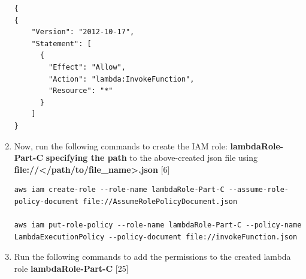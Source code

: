 \begin{enumerate}
\begin{mdframed}[linewidth=1pt]
\lstset{language=json}
\begin{lstlisting}
{
{
    "Version": "2012-10-17",
    "Statement": [
      {
        "Effect": "Allow",
        "Action": "lambda:InvokeFunction",
        "Resource": "*"
      }
    ]
}
\end{lstlisting}
\end{mdframed}

 \item Now, run the following commands to create the IAM role: \textbf{lambdaRole-Part-C} \textbf{specifying the path} to the above-created json file using \textbf{file://\textless /path/to/file_name\textgreater.json} [6]




\begin{mdframed}[linewidth=1pt]
\lstset{language=PowerShell}
\begin{lstlisting}[basicstyle=\ttfamily\small, breaklines=true]
aws iam create-role --role-name lambdaRole-Part-C --assume-role-policy-document file://AssumeRolePolicyDocument.json

aws iam put-role-policy --role-name lambdaRole-Part-C --policy-name LambdaExecutionPolicy --policy-document file://invokeFunction.json
\end{lstlisting}
\end{mdframed}
   

    \item Run the following commands to add the permissions to the created lambda role \textbf{lambdaRole-Part-C} [25]
    



\end{enumerate}
